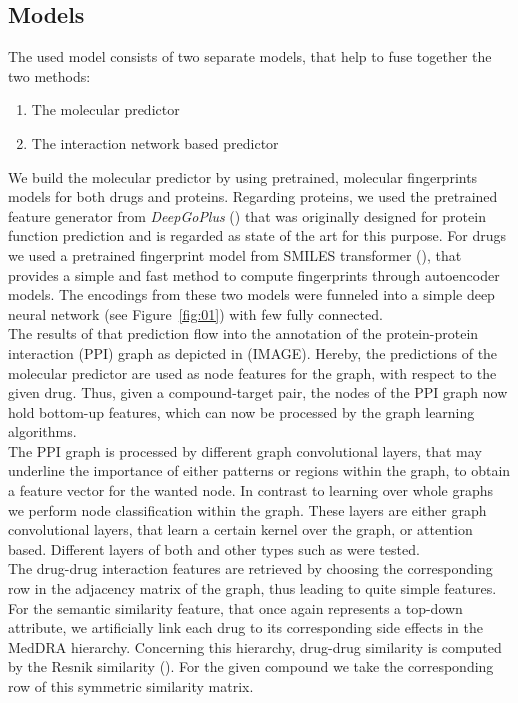 \documentclass{bioinfo}
\begin{document}
\subsection{Models}
The used model consists of two separate models, that help to fuse together the two methods:
\begin{enumerate}
	\item The molecular predictor
	\item The interaction network based predictor
\end{enumerate}
We build the molecular predictor by using pretrained, molecular fingerprints models for both drugs and proteins. Regarding proteins, we used the pretrained feature generator from \textit{DeepGoPlus} (\citep{DeepGoPlus}) that was originally designed for protein function prediction and is regarded as state of the art for this purpose. For drugs we used a pretrained fingerprint model from SMILES transformer (\cite{SmilesTransformer}), that provides a simple and fast method to compute fingerprints through autoencoder models. The encodings from these two models were funneled into a simple deep neural network (see Figure~\ref{fig:01}) with few fully connected. \\
The results of that prediction flow into the annotation of the protein-protein interaction (PPI) graph as depicted in (IMAGE). Hereby, the predictions of the molecular predictor are used as node features for the graph, with respect to the given drug. Thus, given a compound-target pair, the nodes of the PPI graph now hold bottom-up features, which can now be processed by the graph learning algorithms. \\
The PPI graph is processed by different graph convolutional layers, that may underline the importance of either patterns or regions within the graph, to obtain a feature vector for the wanted node. In contrast to learning over whole graphs we perform node classification within the graph. These layers are either graph convolutional layers, that learn a certain kernel over the graph, or attention based. Different layers of both and other types such as were tested.  \\
The drug-drug interaction features are retrieved by choosing the corresponding row in the adjacency matrix of the graph, thus leading to quite simple features. \\
For the semantic similarity feature, that once again represents a top-down attribute, we artificially link each drug to its corresponding side effects in the MedDRA hierarchy. Concerning this hierarchy, drug-drug similarity is computed by the Resnik similarity (\cite{Resnik1995}). For the given compound we take the corresponding row of this symmetric similarity matrix. \\
\end{document}
